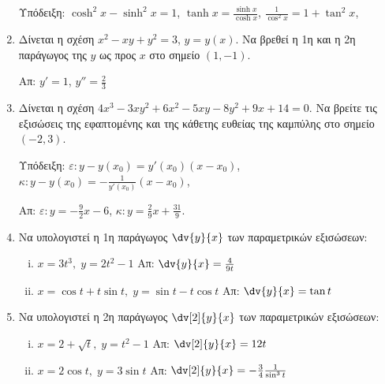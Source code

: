 \documentclass[a4paper,table]{report}
\begin{document}
\begin{enumerate}
    \textcolor{Col1}{Υπόδειξη:} 
      $ \cosh^{2}{x} - \sinh^{2}{x} = 1 $, \;
      $ \tanh{x} = \frac{\sinh{x}}{\cosh{x}}$, \; 
      $ \frac{1}{\cos^{2}{x}} = 1+ \tan^{2}{x} $, \; 
      \begin{enumerate}[(i)]
      \end{enumerate}

  \item Δίνεται η σχέση $ x^{2} - xy + y^{2} = 3 $, $ y=y(x) $. Να βρεθεί η 1η
    και η 2η παράγωγος της $y$ ως προς $x$ στο σημείο $ (1,-1) $.

    \hfill Απ: $ y' = 1$, $ y'' = \frac{2}{3} $

  \item Δίνεται η σχέση $ 4x^{3} - 3xy^{2} + 6x^{2} - 5xy - 8 y^{2} + 9x + 14
    = 0$. Να βρείτε τις εξισώσεις της εφαπτομένης και της κάθετης ευθείας
    της καμπύλης στο σημείο $ (-2,3) $.

    \textcolor{Col1}{Υπόδειξη:} 
    $ \varepsilon: y-y(x_{0}) = y'(x_{0})(x- x_{0}) $, \;
    $ \kappa: y-y(x_{0}) = -\frac{1}{y'(x_{0})}(x- x_{0}) $, \;

    \hfill Απ: $\varepsilon\colon y = -\frac{9}{2} x - 6 $, 
    $\kappa\colon y = \frac{2}{9} x + \frac{31}{9} $.

  \item Να υπολογιστεί η 1η παράγωγος $ \dv{y}{x} $ των παραμετρικών εξισώσεων:
    \begin{enumerate}[i)]
      \item $ x = 3t^{3}, \; y=2t^{2}-1 $ \hfill Απ: $ \dv{y}{x} = \frac{4}{9t} $ 
      \item $ x = \cos{t} + t \sin{t}, \; y= \sin{t} - t \cos{t} $ 
        \hfill Απ: $ \dv{y}{x} = \tan{t} $ 
    \end{enumerate}

  \item Να υπολογιστεί η 2η παράγωγος $ \dv[2]{y}{x}$ των παραμετρικών εξισώσεων:
    \begin{enumerate}[i)]
      \item $ x=2 + \sqrt{t}, \; y=t^{2}-1 $ \hfill Απ: $ \dv[2]{y}{x} = 12 t $ 
      \item $ x=2 \cos{t}, \; y= 3 \sin{t}  $ \hfill Απ: $ \dv[2]{y}{x} = -
        \frac{3}{4} \frac{1}{\sin^{3}{t}} $  
    \end{enumerate}


\end{enumerate}
\end{document}
